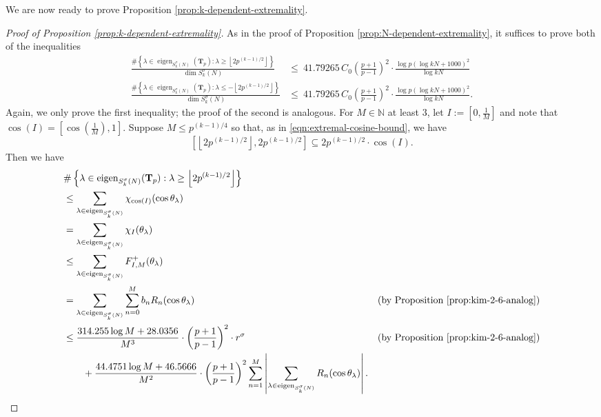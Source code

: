 \documentclass[11pt,letterpaper,reqno]{amsart}
\theoremstyle{definition}
\numberwithin{equation}{section}
\numberwithin{figure}{section}
\numberwithin{table}{section}
\begin{document}
We are now ready to prove Proposition \ref{prop:k-dependent-extremality}.

\begin{proof}[Proof of Proposition \ref{prop:k-dependent-extremality}]
    As in the proof of Proposition \ref{prop:N-dependent-extremality}, it suffices to prove both of the inequalities
    \begin{align}
        \frac{\#\left\{ \lambda \in \operatorname{eigen}_{ S_k^\sigma(N)} \! \left( \mathbf{T}_{p}  \right) :  \lambda  \geq \left\lfloor 2 p^{(k - 1)/2}  \right\rfloor \right\}}{\dim S_k^\sigma(N)} &\leq \ 41.79265  \, C_0 \left( \frac{p + 1}{p - 1} \right)^2  \cdot \frac{ \log p  \left(  \log kN + 1000 \right)^2}{\log kN}\\
        \frac{\#\left\{ \lambda \in \operatorname{eigen}_{ S_k^\sigma(N)} \! \left( \mathbf{T}_{p}  \right) :  \lambda  \leq - \left\lfloor 2 p^{(k - 1)/2}  \right\rfloor \right\}}{\dim S_k^\sigma(N)} &\leq \ 41.79265 \, C_0 \left( \frac{p + 1}{p - 1} \right)^2  \cdot \frac{ \log p  \left(  \log kN + 1000 \right)^2}{\log kN}.
    \end{align}
    Again, we only prove the first inequality; the proof of the second is analogous. For $M \in \mathbb{N}$ at least $3$, let $I := \left[0, \frac{1}{M} \right]$ and note that $\cos(I) = \left[ \cos \left( \frac{1}{M} \right), 1  \right]$. Suppose $M \leq p^{(k - 1)/4}$ so that, as in \eqref{eqn:extremal-cosine-bound}, we have
    $$\left[\left\lfloor 2 p^{(k - 1)/2}  \right\rfloor,  2 p^{(k - 1)/2}   \right] \subseteq 2p^{(k - 1)/2} \cdot \cos(I).$$
    Then we have
    \begin{align*}
        & \#\left\{ \lambda \in \operatorname{eigen}_{ S_k^\sigma(N)} \! \left( \mathbf{T}_{p}  \right) :  \lambda \geq \left\lfloor 2 p^{(k - 1)/2}  \right\rfloor \right\} \\
        &\leq \sum_{\lambda \in \operatorname{eigen}_{ S_k^\sigma(N)}} \chi_{\cos(I)}(\cos \theta_\lambda)\\
        &= \sum_{\lambda \in \operatorname{eigen}_{ S_k^\sigma(N)}} \chi_{I}(\theta_\lambda) \\
        &\leq \sum_{\lambda \in \operatorname{eigen}_{ S_k^\sigma(N)}} F_{I, M}^+(\theta_\lambda)\\
        &= \sum_{\lambda \in \operatorname{eigen}_{ S_k^\sigma(N)}} \sum_{n = 0}^M b_{n} R_n(\cos \theta_\lambda) & \text{(by Proposition \ref{prop:kim-2-6-analog})}\\
        &\leq \frac{314.255 \log M + 28.0356}{M^3} \cdot \left( \frac{p + 1}{p - 1} \right)^2 \cdot r^\sigma 
        & \text{(by Proposition \ref{prop:kim-2-6-analog})}
        \\
        &\qquad + \frac{44.4751 \log M + 46.5666}{M^2}  \cdot \left( \frac{p + 1}{p - 1} \right)^2 \sum_{n = 1}^M  \left| \sum_{\lambda \in \operatorname{eigen}_{ S_k^\sigma(N)}} R_n(\cos \theta_\lambda) \right|.
    \end{align*}
    

\end{proof}
\end{document}

